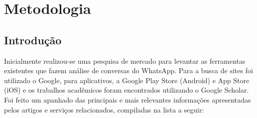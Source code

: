 \chapter{Metodologia}


\section{Introdução}

Inicialmente realizou-se uma pesquisa de mercado para levantar as ferramentas existentes que fazem análise de conversas do WhatsApp. Para a busca de sites foi utilizado o Google, para aplicativos, a Google Play Store (Android) e App Store (iOS) e os trabalhos acadêmicos foram encontrados utilizando o Google Scholar. Foi feito um apanhado das principais e mais relevantes informações apresentadas pelos artigos e serviços relacionados, compiladas na lista a seguir:
